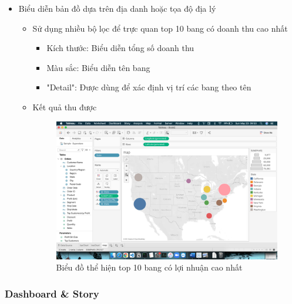 \documentclass[a4paper, 12pt]{article}
\begin{document}
\begin{itemize}
    \item Biểu diễn bản đồ dựa trên địa danh hoặc tọa độ địa lý
    \begin{itemize}
        \item Sử dụng nhiều bộ lọc để trực quan top 10 bang có doanh thu cao nhất
        \begin{itemize}
            \item Kích thước: Biểu diễn tổng số doanh thu 
            \item Màu sắc: Biểu diễn tên bang 
            \item "Detail": Được dùng để xác định vị trí các bang theo tên
        \end{itemize}

        \item Kết quả thu được
        \begin{figure}[H]
            \begin{center}
                \includegraphics[scale=0.4]{img/map.png}
                \caption{Biểu đồ thể hiện top 10 bang có lợi nhuận cao nhất}
            \end{center}
        \end{figure}
    \end{itemize}
\end{itemize}

\subsubsection{Dashboard \& Story}
\end{document}
